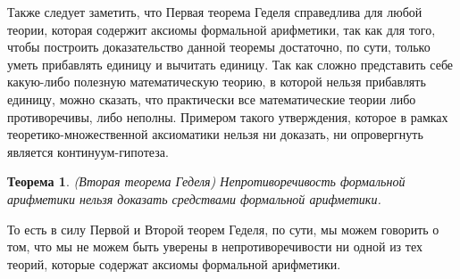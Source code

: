 \documentclass[a4paper]{article}
\newtheorem{theorem} {Теорема}
\begin{document}
{Также следует заметить, что Первая теорема Геделя справедлива для любой теории, которая содержит аксиомы формальной арифметики, так как для того, чтобы построить доказательство данной теоремы достаточно, по сути, только уметь прибавлять единицу и вычитать единицу. Так как сложно представить себе какую-либо полезную математическую теорию, в которой нельзя прибавлять единицу, можно сказать, что практически все математические теории либо противоречивы, либо неполны. Примером такого утверждения, которое в рамках теоретико-множественной аксиоматики нельзя ни доказать, ни опровергнуть является континуум-гипотеза. 

\begin{theorem}(Вторая теорема Геделя)
Непротиворечивость формальной арифметики нельзя доказать средствами формальной арифметики.
\end{theorem}

То есть в силу Первой и Второй теорем Геделя, по сути, мы можем говорить о том, что мы не можем быть уверены в непротиворечивости ни одной из тех теорий, которые содержат аксиомы формальной арифметики.
}
\end{document}
